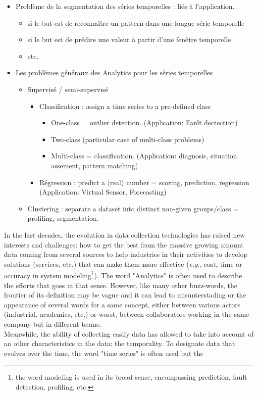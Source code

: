 \begin{itemize}
	\item Problème de la segmentation des séries temporelles : liés à l'application.
	\begin{itemize}
		\item si le but est de reconnaître un pattern dans une longue série temporelle
		\item si le but est de prédire une valeur à partir d'une fenêtre temporelle
		\item etc.
	\end{itemize}
	\item Les problèmes généraux des Analytics pour les séries temporelles 
	\begin{itemize}
		\item Supervisé / semi-supervisé
		\begin{itemize}
			\item Classification : assign a time series to a pre-defined class
			\begin{itemize}
				\item One-class = outlier detection. (Application: Fault dectection)
				\item Two-class (particular case of multi-class problems)
				\item Multi-class = classification. (Application: diagnosis, situation assement, pattern matching)
			\end{itemize}
			\item Régression : predict a (real) number = scoring, prediction, regression (Application: Virtual Sensor, Forecasting)
		\end{itemize}
		\item Clustering : separate a dataset into distinct non-given groups/class = profiling, segmentation.
	\end{itemize}
\end{itemize}

In the last decades, the evolution in data collection technologies has raised new interests and challenges: how to get the best from the massive growing amount data coming from several sources to help industries in their activities to develop solutions (services, etc.) that can make them more effective (\textit{e.g.}, cost, time or accuracy in system modeling\footnote{the word modeling is used in its broad sense, encompassing prediction, fault detection, profiling, etc.}). The word "Analytics" is often used to describe the efforts that goes in that sense. However, like many other buzz-words, the frontier of its definition may be vague and it can lead to misunterstading or the appearance of several words for a same concept, either between various actors (industrial, academics, etc.) or worst, between collaborators working in the same company but in different teams. \\
Meanwhile, the ability of collecting easily data has allowed to take into account of an other characteristics in the data: the temporality. To designate data that evolves over the time, the word "time series" is often used but the

